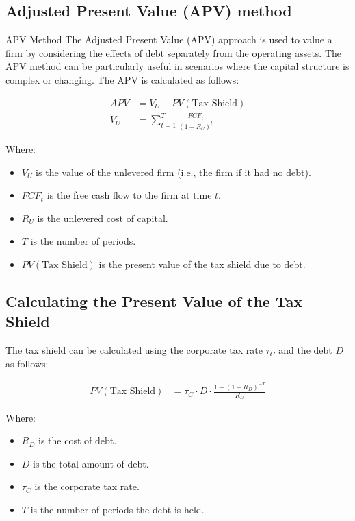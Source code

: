\subsection*{Adjusted Present Value (APV) method}
\begin{sidenotebox}{APV Method}
    The Adjusted Present Value (APV) approach is used to value a firm by considering the effects of debt separately from the operating assets. The APV method can be particularly useful in scenarios where the capital structure is complex or changing. The APV is calculated as follows:

\begin{align}
    APV &= V_U + PV(\text{Tax Shield}) \\
    V_U &= \sum_{t=1}^{T} \frac{FCF_t}{(1 + R_U)^t}
\end{align}

Where:
\begin{itemize}
    \item \( V_U \) is the value of the unlevered firm (i.e., the firm if it had no debt).
    \item \( FCF_t \) is the free cash flow to the firm at time \( t \).
    \item \( R_U \) is the unlevered cost of capital.
    \item \( T \) is the number of periods.
    \item \( PV(\text{Tax Shield}) \) is the present value of the tax shield due to debt.
\end{itemize}


\subsection*{Calculating the Present Value of the Tax Shield}

The tax shield can be calculated using the corporate tax rate \( \tau_C \) and the debt \( D \) as follows:

\begin{align}
    PV(\text{Tax Shield}) &= \tau_C \cdot D \cdot \frac{1 - (1 + R_D)^{-T}}{R_D}
\end{align}

Where:
\begin{itemize}
    \item \( R_D \) is the cost of debt.
    \item \( D \) is the total amount of debt.
    \item \( \tau_C \) is the corporate tax rate.
    \item \( T \) is the number of periods the debt is held.
\end{itemize}


\end{sidenotebox}
